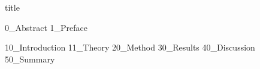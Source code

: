 \documentclass{article}
\begin{document}
{title}

\frontmatter \ownfrontmatter

{0_Abstract}
{1_Preface}

\tableofcontents

\listoffigures
\listoftables

\pagebreak


\mainmatter \ownmainmatter

{10_Introduction}   %
{11_Theory}         %
{20_Method}         %
{30_Results}        %
{40_Discussion}     %
{50_Summary}        %


\newpage
\printbibliography[heading = bibintoc, title = Bibliography]    %


\end{document}
